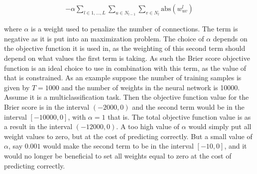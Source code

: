 \begin{align}
    \label{min_connections}  - \alpha \sum_{l\in{1, \ldots, L}} \sum_{u \in N_{l-1}} \sum_{v \in N_l}  \text{abs}(w^l_{uv})
\end{align}

\noindent where $\alpha$ is a weight used to penalize the number of connections. The term is negative as it is put into an maximization problem. The choice of $\alpha$ depends on the objective function it is used in, as the weighting of this second term should depend on what values the first term is taking. As such the Brier score objective function is an ideal choice to use in combination with this term, as the value of that is constrained. As an example suppose the number of training samples is given by $T = 1000$ and the number of weights in the neural network is 10000. Assume it is a multiclassification task. Then the objective function value for the Brier score is in the interval $(-2000, 0)$ and the second term would be in the interval $[-10000, 0]$, with $\alpha = 1$ that is. The total objective function value is as a result in the interval $(-12000, 0)$. A too high value of $\alpha$ would simply put all weight values to zero, but at the cost of predicting correctly. But a small value of $\alpha$, say $0.001$ would make the second term to be in the interval $[-10, 0]$, and it would no longer be beneficial to set all weights equal to zero at the cost of predicting correctly. 











